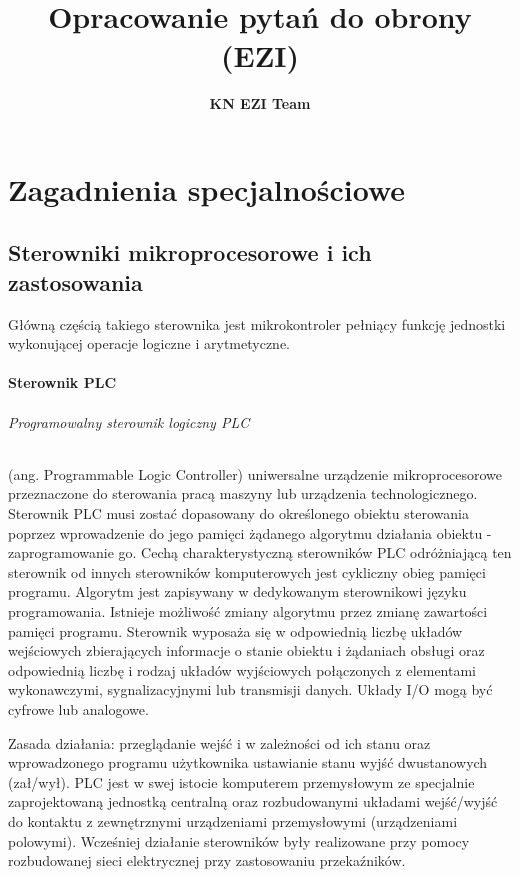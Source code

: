 \documentclass[]{report}
\author{\textbf{KN EZI Team}}
\title{Opracowanie pytań do obrony (EZI)}
\begin{document}
\maketitle
\tableofcontents %
\thispagestyle{empty}


\part{Zagadnienia specjalnościowe}
\bigskip
\chapter{Sterowniki mikroprocesorowe i ich zastosowania}

Główną częścią takiego sterownika jest mikrokontroler pełniący funkcję jednostki wykonującej operacje logiczne i arytmetyczne.

\subsection{Sterownik PLC}

\paragraph{Programowalny sterownik logiczny PLC} (ang. Programmable Logic Controller) uniwersalne urządzenie mikroprocesorowe przeznaczone do sterowania pracą maszyny lub urządzenia technologicznego. Sterownik PLC musi zostać dopasowany do określonego obiektu sterowania poprzez wprowadzenie do jego pamięci żądanego algorytmu działania obiektu - zaprogramowanie go. Cechą charakterystyczną sterowników PLC odróżniającą ten sterownik od innych sterowników komputerowych jest cykliczny obieg pamięci programu. Algorytm jest zapisywany w dedykowanym sterownikowi języku programowania. Istnieje możliwość zmiany algorytmu przez zmianę zawartości pamięci programu. Sterownik wyposaża się w odpowiednią liczbę układów wejściowych zbierających informacje o stanie obiektu i żądaniach obsługi oraz odpowiednią liczbę i rodzaj układów wyjściowych połączonych z elementami wykonawczymi, sygnalizacyjnymi lub transmisji danych. Układy I/O mogą być cyfrowe lub analogowe.

Zasada działania: przeglądanie wejść i w zależności od ich stanu oraz
wprowadzonego programu użytkownika ustawianie stanu wyjść dwustanowych (zał/wył).
PLC jest w swej istocie komputerem przemysłowym ze specjalnie zaprojektowaną jednostką centralną oraz rozbudowanymi układami wejść/wyjść do kontaktu z zewnętrznymi urządzeniami przemysłowymi (urządzeniami polowymi). Wcześniej działanie sterowników były realizowane przy pomocy rozbudowanej sieci elektrycznej przy zastosowaniu przekaźników.
\end{document}
